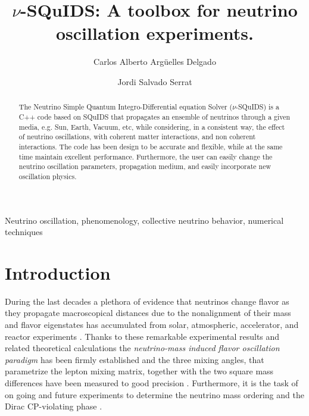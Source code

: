 \documentclass[3p,12pt,authoryear]{elsarticle}
\begin{document}
\begin{frontmatter}

\title{$\nu$-SQuIDS: A toolbox for neutrino oscillation experiments.}

\author[uw,wipac]{Carlos Alberto Arg\"uelles Delgado}
\author[uw,wipac]{Jordi Salvado Serrat}
\address[uw]{Department of Physics, University of Wisconsin, Madison, WI 53706, USA} 
\address[wipac]{Wisconsin IceCube Particle Astrophysics Center, Madison, WI 53703, USA}



\begin{abstract}
The Neutrino Simple Quantum Integro-Differential equation Solver ($\nu$-SQuIDS) is a C++ code based on SQuIDS that propagates an ensemble of neutrinos through a given media, e.g. Sun, Earth, Vacuum, etc, while considering, in a consistent way, the effect of neutrino oscillations, with coherent matter interactions, and non coherent interactions. The code has been design to be accurate and flexible, while at the same time maintain excellent performance. Furthermore, the user can easily change the neutrino oscillation parameters, propagation medium, and easily incorporate new oscillation physics. 
\end{abstract}

\begin{keyword}
Neutrino oscillation, phenomenology, collective neutrino behavior, numerical techniques
\end{keyword}

\end{frontmatter}

\hypersetup{linkcolor=black}
\tableofcontents
\hypersetup{linkcolor=blue}

\section{Introduction}
\label{sec:intro} 

During the last decades a plethora of evidence that neutrinos change flavor as they propagate macroscopical distances due to the nonalignment of their mass and flavor eigenstates has accumulated from solar, atmospheric, accelerator, and reactor experiments \citep{Mohapatra:qv,Gouvea:2013fj}. Thanks to these remarkable experimental results and related theoretical calculations the {\it neutrino-mass induced flavor oscillation paradigm} \citep{Pontecorvo:1967fh,Gribov:1968kq,fukugita2003physics,Akhmedov:1999uz,Balantekin:2013kc,GonzalezGarcia:2007ib} has been firmly established and the three mixing angles, that parametrize the lepton mixing matrix, together with the two square mass differences have been measured to good precision \citep{Gonzalez-Garcia:2014bfa}. Furthermore, it is the task of on going and future experiments to determine the neutrino mass ordering and the Dirac CP-violating phase \citep{Hewett:2012et}.
\end{document}
